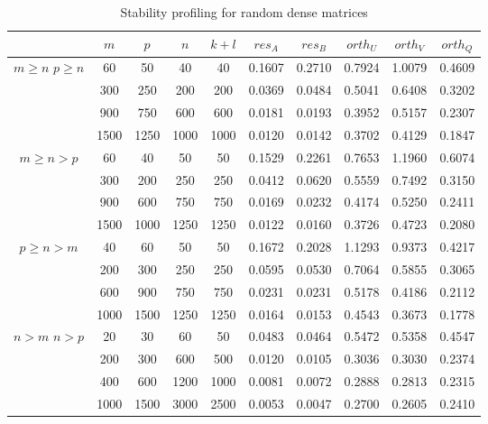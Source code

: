     \begin{table}[!htbp]
        \centering
        \begin{tabular}{||c | c | c | c | c || c | c | c | c | c||} 
         \hline
         & $m$ & $p$ & $n$ & $k+l$ & $res_A$ & $res_B$ & $orth_U$ & $orth_V$ & $orth_Q$ \\ [0.5ex] 
         \hline\hline
          & 60 & 50 & 40 & 40 & 0.1607 & 0.2710 & 0.7924 & 1.0079 & 0.4609 \\
         & 300 & 250 & 200 & 200 & 0.0369 & 0.0484 & 0.5041 & 0.6408 & 0.3202 \\
         & 900 & 750 & 600 & 600 & 0.0181 & 0.0193 & 0.3952 & 0.5157 & 0.2307 \\
         & 1500 & 1250 & 1000 & 1000 & 0.0120 & 0.0142 & 0.3702 & 0.4129 & 0.1847 \\
        \hline\hline
          & 60 & 40 & 50 & 50 & 0.1529 & 0.2261 & 0.7653 & 1.1960 & 0.6074 \\
         & 300 & 200 & 250 & 250 & 0.0412 & 0.0620 & 0.5559 & 0.7492 & 0.3150 \\
         & 900 & 600 & 750 & 750 & 0.0169 & 0.0232 & 0.4174 & 0.5250 & 0.2411 \\
         & 1500 & 1000 & 1250 & 1250 & 0.0122 & 0.0160 & 0.3726 & 0.4723 & 0.2080 \\
         \hline\hline 
          & 40 & 60 & 50 & 50 & 0.1672 & 0.2028 & 1.1293 & 0.9373  & 0.4217\\
         & 200 & 300 & 250 & 250 & 0.0595 & 0.0530 & 0.7064 & 0.5855 &  0.3065 \\
         & 600 & 900 & 750 & 750 & 0.0231 & 0.0231 & 0.5178 & 0.4186 & 0.2112 \\
         & 1000 & 1500 & 1250 & 1250 & 0.0164 & 0.0153 & 0.4543 & 0.3673 & 0.1778 \\
         \hline \hline
          & 20 & 30 & 60 & 50 & 0.0483 & 0.0464 & 0.5472 & 0.5358 & 0.4547\\
         & 200 & 300 & 600 & 500 & 0.0120 & 0.0105 & 0.3036 & 0.3030 & 0.2374 \\
         & 400 & 600 & 1200 & 1000 & 0.0081 & 0.0072 & 0.2888 & 0.2813 & 0.2315\\
         & 1000 & 1500 & 3000 & 2500 & 0.0053 & 0.0047 & 0.2700 & 0.2605 & 0.2410 \\
         \hline
        \end{tabular}
        \caption{Stability profiling for random dense matrices}
        \label{tab: sta_test_2}
        \end{table}
    
